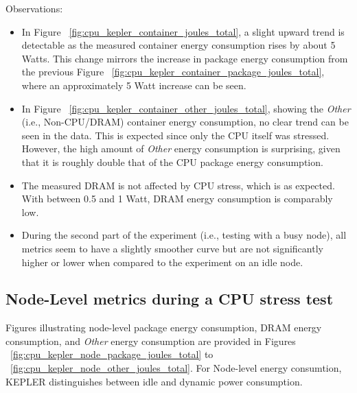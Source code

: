 Observations:
\begin{itemize}
    \item In Figure ~\ref{fig:cpu_kepler_container_joules_total}, a slight upward trend is detectable as the measured container energy consumption rises by about 5 Watts. This change mirrors the increase in package energy consumption from the previous Figure ~\ref{fig:cpu_kepler_container_package_joules_total}, where an approximately 5 Watt increase can be seen.
    \item In Figure ~\ref{fig:cpu_kepler_container_other_joules_total}, showing the \textit{Other} (i.e., Non-CPU/DRAM) container energy consumption, no clear trend can be seen in the data. This is expected since only the CPU itself was stressed. However, the high amount of \textit{Other} energy consumption is surprising, given that it is roughly double that of the CPU package energy consumption.
    \item The measured DRAM is not affected by CPU stress, which is as expected. With between 0.5 and 1 Watt, DRAM energy consumption is comparably low.
    \item During the second part of the experiment (i.e., testing with a busy node), all metrics seem to have a slightly smoother curve but are not significantly higher or lower when compared to the experiment on an idle node.
\end{itemize}

\subsection{Node-Level metrics during a CPU stress test}


Figures illustrating node-level package energy consumption, DRAM energy consumption, and \textit{Other} energy consumption are provided in Figures ~\ref{fig:cpu_kepler_node_package_joules_total} to ~\ref{fig:cpu_kepler_node_other_joules_total}. For Node-level energy consumtion, KEPLER distinguishes between idle and dynamic power consumption.

